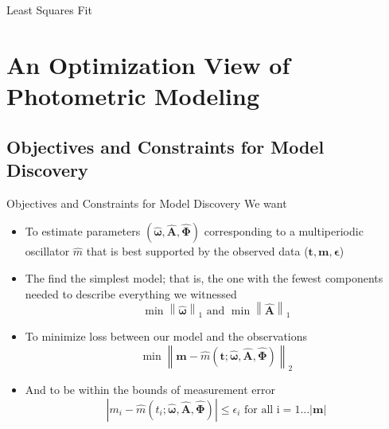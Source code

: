 \documentclass[serif,mathserif,professionalfont]{beamer}
\begin{document}
\begin{frame}{Least Squares Fit}
\begin{figure}
\centering

\end{figure} 
\end{frame}

\section{An Optimization View of Photometric Modeling}
\subsection{Objectives and Constraints for Model Discovery}
\begin{frame}{Objectives and Constraints for Model Discovery}
We want
\begin{itemize}
\item To estimate parameters $(\boldsymbol{\hat \omega}, \mathbf {\hat A}, \boldsymbol{\hat \Phi})$ corresponding to a multiperiodic oscillator $\hat m$ that is best supported by the observed data ($\mathbf{t}, \mathbf{m}, \boldsymbol \epsilon$) \pause 

\item The find the simplest model; that is, the one with the fewest components needed to describe everything we witnessed 
$$\min \left\| \boldsymbol{\hat \omega} \right\|_1 \text{ and } \min \left\| \mathbf{\hat{A}} \right\|_1$$ \pause

\item To minimize loss between our model and the observations
$$\min \left\| \mathbf m - \hat m(\mathbf t ; \boldsymbol{\hat \omega}, \mathbf {\hat A}, \boldsymbol{\hat \Phi})\right\|_2$$ \pause

\item And to be within the bounds of measurement error
$$|m_i - \hat m(t_i ; \boldsymbol{\hat \omega}, \mathbf {\hat A}, \boldsymbol{\hat \Phi})| \leq \epsilon_i \text{ for all i}=1\ldots |\mathbf{m}| $$

\end{itemize}
\end{frame}
\end{document}

